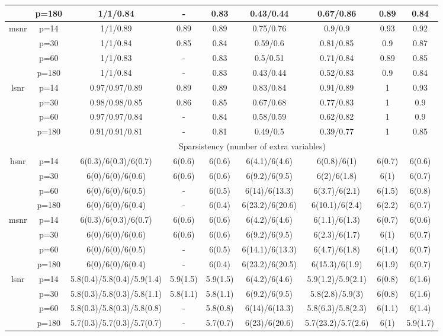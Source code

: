 \begin{table}[ht]
{\begin{tabular}{|c|c|ccccccc|}
   & p=180 & 1/1/0.84 & - & 0.83 & 0.43/0.44 & 0.67/0.86 & 0.89 & 0.84 \\ 
  \midrule\multirow{4}[2]{*}{msnr} & p=14 & 1/1/0.89 & 0.89 & 0.89 & 0.75/0.76 & 0.9/0.9 & 0.93 & 0.92 \\ 
   & p=30 & 1/1/0.84 & 0.85 & 0.84 & 0.59/0.6 & 0.81/0.85 & 0.9 & 0.87 \\ 
   & p=60 & 1/1/0.83 & - & 0.83 & 0.5/0.51 & 0.71/0.84 & 0.89 & 0.85 \\ 
   & p=180 & 1/1/0.84 & - & 0.83 & 0.43/0.44 & 0.52/0.83 & 0.9 & 0.84 \\ 
  \midrule\multirow{4}[2]{*}{lsnr} & p=14 & 0.97/0.97/0.89 & 0.89 & 0.89 & 0.83/0.84 & 0.91/0.89 & 1 & 0.93 \\ 
   & p=30 & 0.98/0.98/0.85 & 0.86 & 0.85 & 0.67/0.68 & 0.77/0.83 & 1 & 0.9 \\ 
   & p=60 & 0.97/0.97/0.84 & - & 0.84 & 0.58/0.59 & 0.62/0.82 & 1 & 0.9 \\ 
   & p=180 & 0.91/0.91/0.81 & - & 0.81 & 0.49/0.5 & 0.39/0.77 & 1 & 0.85 \\ 
   \midrule 
 \multicolumn{1}{|c}{} &       & \multicolumn{7}{c|}{Sparsistency (number of extra variables)} \\
\midrule\multirow{4}[2]{*}{hsnr} & p=14 & 6(0.3)/6(0.3)/6(0.7) & 6(0.6) & 6(0.6) & 6(4.1)/6(4.6) & 6(0.8)/6(1) & 6(0.7) & 6(0.6) \\ 
   & p=30 & 6(0)/6(0)/6(0.6) & 6(0.6) & 6(0.6) & 6(9.2)/6(9.5) & 6(2)/6(1.8) & 6(1) & 6(0.7) \\ 
   & p=60 & 6(0)/6(0)/6(0.5) & - & 6(0.5) & 6(14)/6(13.3) & 6(3.7)/6(2.1) & 6(1.5) & 6(0.8) \\ 
   & p=180 & 6(0)/6(0)/6(0.4) & - & 6(0.4) & 6(23.2)/6(20.6) & 6(10.1)/6(2.4) & 6(2.2) & 6(0.7) \\ 
  \midrule\multirow{4}[2]{*}{msnr} & p=14 & 6(0.3)/6(0.3)/6(0.7) & 6(0.6) & 6(0.6) & 6(4.2)/6(4.6) & 6(1.1)/6(1.3) & 6(0.7) & 6(0.6) \\ 
   & p=30 & 6(0)/6(0)/6(0.6) & 6(0.6) & 6(0.6) & 6(9.2)/6(9.5) & 6(2.3)/6(1.7) & 6(1) & 6(0.7) \\ 
   & p=60 & 6(0)/6(0)/6(0.5) & - & 6(0.5) & 6(14.1)/6(13.3) & 6(4.7)/6(1.8) & 6(1.4) & 6(0.7) \\ 
   & p=180 & 6(0)/6(0)/6(0.4) & - & 6(0.4) & 6(23.2)/6(20.5) & 6(15.3)/6(1.9) & 6(1.9) & 6(0.7) \\ 
  \midrule\multirow{4}[2]{*}{lsnr} & p=14 & 5.8(0.4)/5.8(0.4)/5.9(1.4) & 5.9(1.5) & 5.9(1.5) & 6(4.2)/6(4.6) & 5.9(1.2)/5.9(2.1) & 6(0.8) & 6(1.6) \\ 
   & p=30 & 5.8(0.3)/5.8(0.3)/5.8(1.1) & 5.8(1.1) & 5.8(1.1) & 6(9.2)/6(9.5) & 5.8(2.8)/5.9(3) & 6(0.8) & 6(1.6) \\ 
   & p=60 & 5.8(0.3)/5.8(0.3)/5.8(0.8) & - & 5.8(0.8) & 6(14)/6(13.3) & 5.8(6.3)/5.8(2.3) & 6(1.1) & 6(1.4) \\ 
   & p=180 & 5.7(0.3)/5.7(0.3)/5.7(0.7) & - & 5.7(0.7) & 6(23)/6(20.6) & 5.7(23.2)/5.7(2.6) & 6(1) & 5.9(1.7) \\ 
   \bottomrule 
\end{tabular}
}
\end{table}
